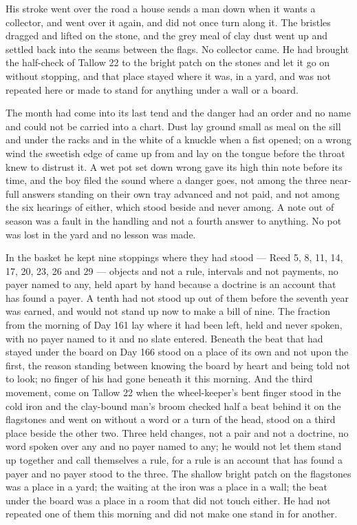 His stroke went over the road a house sends a man down when it wants a collector, and went over it again, and did not once turn along it. The bristles dragged and lifted on the stone, and the grey meal of clay dust went up and settled back into the seams between the flags. No collector came. He had brought the half-check of Tallow 22 to the bright patch on the stones and let it go on without stopping, and that place stayed where it was, in a yard, and was not repeated here or made to stand for anything under a wall or a board.

\scenebreak

The month had come into its last tend and the danger had an order and no name and could not be carried into a chart. Dust lay ground small as meal on the sill and under the racks and in the white of a knuckle when a fist opened; on a wrong wind the sweetish edge of  came up from  and lay on the tongue before the throat knew to distrust it. A wet pot set down wrong gave its high thin note before its time, and the boy filed the sound where a danger goes, not among the three near-full answers standing on their own tray advanced and not paid, and not among the six hearings of  either, which stood beside and never among. A note out of season was a fault in the handling and not a fourth answer to anything. No pot was lost in the yard and no lesson was made.

In the basket he kept nine stoppings where they had stood --- Reed 5, 8, 11, 14, 17, 20, 23, 26 and 29 --- objects and not a rule, intervals and not payments, no payer named to any, held apart by hand because a doctrine is an account that has found a payer. A tenth had not stood up out of them before the seventh year was earned, and would not stand up now to make a bill of nine. The fraction from the morning of Day 161 lay where it had been left, held and never spoken, with no payer named to it and no slate entered. Beneath  the beat that had stayed under the board on Day 166 stood on a place of its own and not upon the first, the reason standing between knowing the board by heart and being told not to look; no finger of his had gone beneath it this morning. And the third movement, come on Tallow 22 when the wheel-keeper's bent finger stood in the cold iron and the clay-bound man's broom checked half a beat behind it on the flagstones and went on without a word or a turn of the head, stood on a third place beside the other two. Three held changes, not a pair and not a doctrine, no word spoken over any and no payer named to any; he would not let them stand up together and call themselves a rule, for a rule is an account that has found a payer and no payer stood to the three. The shallow bright patch on the flagstones was a place in a yard; the waiting at the iron was a place in a wall; the beat under the board was a place in a room that did not touch either. He had not repeated one of them this morning and did not make one stand in for another.

